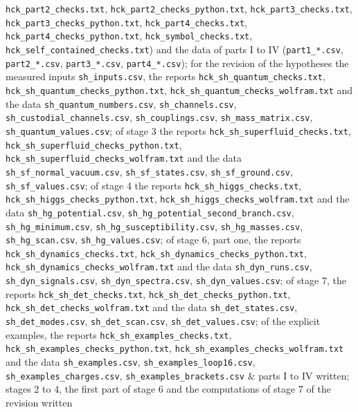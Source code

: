 \documentclass[
  10pt,
]{article}
\begin{document}
\begin{longtable}[]
\texttt{hck\_part2\_checks.txt},
\texttt{hck\_part2\_checks\_python.txt},
\texttt{hck\_part3\_checks.txt},
\texttt{hck\_part3\_checks\_python.txt},
\texttt{hck\_part4\_checks.txt},
\texttt{hck\_part4\_checks\_python.txt},
\texttt{hck\_symbol\_checks.txt},
\texttt{hck\_self\_contained\_checks.txt}) and the data of parts I to IV
(\texttt{part1\_*.csv}, \texttt{part2\_*.csv}, \texttt{part3\_*.csv},
\texttt{part4\_*.csv}); for the revision of the hypotheses the measured
inputs \texttt{sh\_inputs.csv}, the reports
\texttt{hck\_sh\_quantum\_checks.txt},
\texttt{hck\_sh\_quantum\_checks\_python.txt},
\texttt{hck\_sh\_quantum\_checks\_wolfram.txt} and the data
\texttt{sh\_quantum\_numbers.csv}, \texttt{sh\_channels.csv},
\texttt{sh\_custodial\_channels.csv}, \texttt{sh\_couplings.csv},
\texttt{sh\_mass\_matrix.csv}, \texttt{sh\_quantum\_values.csv}; of
stage 3 the reports \texttt{hck\_sh\_superfluid\_checks.txt},
\texttt{hck\_sh\_superfluid\_checks\_python.txt},
\texttt{hck\_sh\_superfluid\_checks\_wolfram.txt} and the data
\texttt{sh\_sf\_normal\_vacuum.csv}, \texttt{sh\_sf\_states.csv},
\texttt{sh\_sf\_ground.csv}, \texttt{sh\_sf\_values.csv}; of stage 4 the
reports \texttt{hck\_sh\_higgs\_checks.txt},
\texttt{hck\_sh\_higgs\_checks\_python.txt},
\texttt{hck\_sh\_higgs\_checks\_wolfram.txt} and the data
\texttt{sh\_hg\_potential.csv},
\texttt{sh\_hg\_potential\_second\_branch.csv},
\texttt{sh\_hg\_minimum.csv}, \texttt{sh\_hg\_susceptibility.csv},
\texttt{sh\_hg\_masses.csv}, \texttt{sh\_hg\_scan.csv},
\texttt{sh\_hg\_values.csv}; of stage 6, part one, the reports
\texttt{hck\_sh\_dynamics\_checks.txt},
\texttt{hck\_sh\_dynamics\_checks\_python.txt},
\texttt{hck\_sh\_dynamics\_checks\_wolfram.txt} and the data
\texttt{sh\_dyn\_runs.csv}, \texttt{sh\_dyn\_signals.csv},
\texttt{sh\_dyn\_spectra.csv}, \texttt{sh\_dyn\_values.csv}; of stage 7,
the reports \texttt{hck\_sh\_det\_checks.txt},
\texttt{hck\_sh\_det\_checks\_python.txt},
\texttt{hck\_sh\_det\_checks\_wolfram.txt} and the data
\texttt{sh\_det\_states.csv}, \texttt{sh\_det\_modes.csv},
\texttt{sh\_det\_scan.csv}, \texttt{sh\_det\_values.csv}; of the
explicit examples, the reports \texttt{hck\_sh\_examples\_checks.txt},
\texttt{hck\_sh\_examples\_checks\_python.txt},
\texttt{hck\_sh\_examples\_checks\_wolfram.txt} and the data
\texttt{sh\_examples.csv}, \texttt{sh\_examples\_loop16.csv},
\texttt{sh\_examples\_charges.csv}, \texttt{sh\_examples\_brackets.csv}
& parts I to IV written; stages 2 to 4, the first part of stage 6 and
the computations of stage 7 of the revision written \\

\end{longtable}
\end{document}
